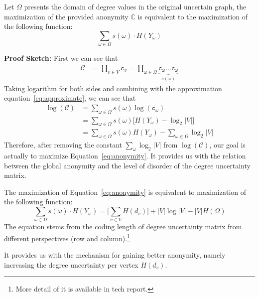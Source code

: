 \begin{lemma}
Let $\Omega$ presents the domain of degree values in the original uncertain graph, the maximization of the provided anonymity $\mathbb{C}$ is equivalent to the maximization of the following function:
  \begin{equation}
      \sum_{\omega \in \Omega} s(\omega) \cdot H(Y_{\omega}) 
      \label{eq:anonymity}
  \end{equation} 
\end{lemma}

{\bf Proof Sketch:} First we can see that 
\begin{align*}
    \mathcal{C} &= \prod_{v \in V} \mathtt{c}_{v} 
                 = \prod_{\omega \in \Omega} \underbrace{\mathtt{c_{\omega}} \ldots \mathtt{c}_{\omega}}_{s(\omega)} 
\end{align*}
Taking logarithm for both sides and combining with the approximation equation~\ref{eq:approximate}, we can see that 
\begin{align*}
    \log(\mathcal{C}) &=\sum_{\omega \in \Omega} s(\omega) \log(\mathtt{c_{\omega}}) \\
                      &=\sum_{\omega \in \Omega} s(\omega) \big[ H(Y_{\omega})-\log_{2}{|V|} \big] \\
                      &=\sum_{\omega  \in \Omega} s(\omega) H(Y_{\omega}) -\sum_{\omega  \in \Omega} \log_{2}{|V|}
\end{align*}
Therefore, after removing the constant $\sum_{\omega} \log_{2}|V|$ from $\log(\mathcal{C})$, our goal is actually to maximize Equation~\ref{eq:anonymity}. It provides us with the relation between the global anonymity and the level of disorder of the degree uncertainty matrix.  

\begin{lemma}
The maximization of Equation~\ref{eq:anonymity} is equivalent to maximization of the following function:
  \begin{equation}
      \sum_{\omega \in \Omega} s(\omega) \cdot H(Y_{\omega}) =\big[ \sum_{v \in V} H(d_{v})\big] + |V|\log{|V|}-|V|H(\Omega)
  \end{equation}
The equation stems from the coding length of degree uncertainty matrix from different perspectives (row and column).\footnote{More detail of it is available in tech report.}
\end{lemma}
It provides us with the mechanism for gaining better anonymity, namely increasing the degree uncertainty per vertex $H(d_{v})$. 

